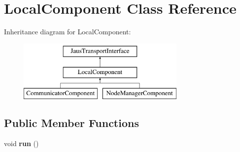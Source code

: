 \hypertarget{class_local_component}{\section{\-Local\-Component \-Class \-Reference}
\label{class_local_component}
}
\-Inheritance diagram for \-Local\-Component\-:\begin{figure}[H]
\begin{center}
\leavevmode
\includegraphics[height=3.000000cm]{class_local_component}
\end{center}
\end{figure}
\subsection*{\-Public \-Member \-Functions}
\begin{DoxyCompactItemize}
\item 
\hypertarget{class_local_component_a92fd3cd2fc16e832ccb9a888596d31e2}{void {\bfseries run} ()}\label{class_local_component_a92fd3cd2fc16e832ccb9a888596d31e2}

\end{DoxyCompactItemize}
